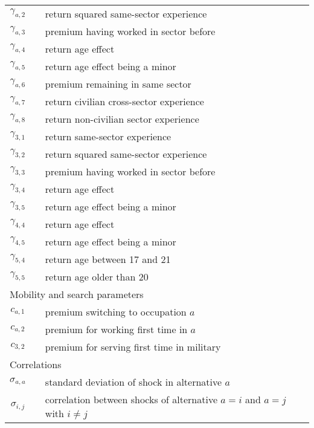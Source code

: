 \begin{ThreePartTable}
\begin{longtable}{@{}cll@{}}
$\gamma_{a,2}$       &  & return squared same-sector experience         								\\
$\gamma_{a,3}$       &  & premium having worked in sector before        							   \\
$\gamma_{a,4}$       &  & return age effect                             											     \\
$\gamma_{a,5}$       &  & return age effect being a minor               										\\
$\gamma_{a,6}$       &  & premium remaining in same sector              								   \\
$\gamma_{a,7}$       &  & return civilian cross-sector experience       								    \\
$\gamma_{a,8}$       &  & return non-civilian sector experience       										 \\
$\gamma_{3,1}$       &  & return same-sector experience                 									  \\
$\gamma_{3,2}$       &  & return squared same-sector experience    										 \\
$\gamma_{3,3}$       &  & premium having worked in sector before   										\\
$\gamma_{3,4}$       &  & return age effect                             												 \\
$\gamma_{3,5}$       &  & return age effect being a minor              	   										\\
$\gamma_{4,4}$       &  & return age effect                             												 \\
$\gamma_{4,5}$       &  & return age effect being a minor                  										\\
$\gamma_{5,4}$       &  & return age between 17 and 21                 	  									   \\
$\gamma_{5,5}$       &  & return age older than 20							   										\\[7.5pt] \midrule
\multicolumn{3}{l}{Mobility and search parameters}          													  \\ \midrule 
$c_{a,1}$            &  & premium switching to occupation $a$           									   \\
$c_{a,2}$            &  & premium for working first time in $a$         										  \\
$c_{3,2}$            &  & premium for serving first time in military    										  \\[7.5pt] \midrule
\multicolumn{3}{l}{Correlations}          													  									\\ \midrule 
$\sigma_{a,a}$	&	& standard deviation of shock in alternative $a$									\\
$\sigma_{i,j}$ &	& correlation between shocks of alternative $a = i$ and $a=j$ with $i \neq j$ \\

\end{longtable}
\end{ThreePartTable}
